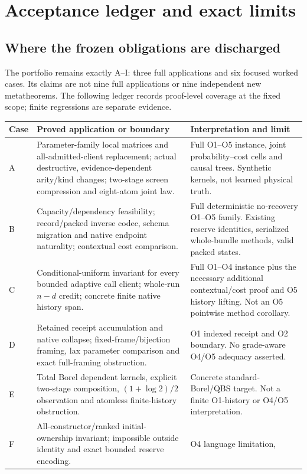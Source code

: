 \section{Acceptance ledger and exact limits}\label{sec:acceptance}

\subsection{Where the frozen obligations are discharged}
The portfolio remains exactly A--I: three full applications and six
focused worked cases. Its claims are not nine full applications or nine
independent new metatheorems. The following ledger records proof-level
coverage at the fixed scope; finite regressions are separate evidence.
\begin{longtable}{@{}p{.08\linewidth}p{.45\linewidth}p{.37\linewidth}@{}}
\toprule Case&Proved application or boundary&Interpretation and limit\\\midrule\endhead
A&Parameter-family local matrices and all-admitted-client replacement;
actual destructive, evidence-dependent arity/kind changes; two-stage
screen compression and eight-atom joint law.&Full O1--O5 instance, joint
probability--cost cells and causal trees. Synthetic kernels, not learned
physical truth.\\
B&Capacity/dependency feasibility; record/packed inverse codec, schema
migration and native endpoint naturality; contextual cost comparison.&Full
deterministic no-recovery O1--O5 family. Existing reserve identities,
serialized whole-bundle methods, valid packed states.\\
C&Conditional-uniform invariant for every bounded adaptive call client;
whole-run $n-d$ credit; concrete finite native history span.&Full O1--O4
instance plus the necessary additional contextual/cost proof and O5
history lifting. Not an O5 pointwise method corollary.\\
D&Retained receipt accumulation and native collapse; fixed-frame/bijection
framing, lax parameter comparison and exact full-framing obstruction.&O1
indexed receipt and O2 boundary. No grade-aware O4/O5 adequacy asserted.\\
E&Total Borel dependent kernels, explicit two-stage composition,
$(1+\log2)/2$ observation and atomless finite-history obstruction.&Concrete
standard-Borel/QBS target. Not a finite O1-history or O4/O5 interpretation.\\
F&All-constructor/ranked initial-ownership invariant; impossible outside
identity and exact bounded reserve encoding.&O4 language limitation,

\end{longtable}
